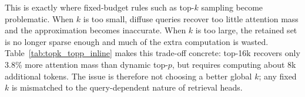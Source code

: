 This is exactly where fixed-budget rules such as top-$k$ sampling become problematic. When $k$ is too small, diffuse queries recover too little attention mass and the approximation becomes inaccurate. When $k$ is too large, the retained set is no longer sparse enough and much of the extra computation is wasted. Table~\ref{tab:topk_topp_inline} makes this trade-off concrete: top-16k recovers only 3.8\% more attention mass than dynamic top-$p$, but requires computing about 8k additional tokens. The issue is therefore not choosing a better global $k$; any fixed $k$ is mismatched to the query-dependent nature of retrieval heads.



